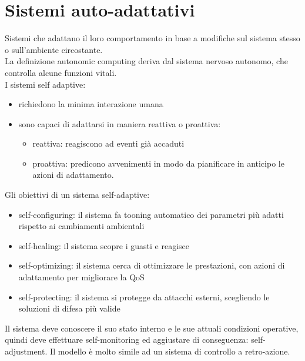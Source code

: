 \documentclass{article}
\begin{document}
\section{Sistemi auto-adattativi}
Sistemi che adattano il loro comportamento in base a modifiche sul sistema stesso o sull'ambiente circostante.\\ La definizione autonomic computing deriva dal sistema nervoso autonomo, che controlla alcune funzioni vitali.\\ I sistemi self adaptive:
\begin{itemize}
\item richiedono la minima interazione umana
\item sono capaci di adattarsi in maniera reattiva o proattiva:
\begin{itemize}
\item reattiva: reagiscono ad eventi già accaduti
\item proattiva: predicono avvenimenti in modo da pianificare in anticipo le azioni di adattamento.
\end{itemize}
\end{itemize}
Gli obiettivi di un sistema self-adaptive:
\begin{itemize}
\item self-configuring: il sistema fa tooning automatico dei parametri più adatti rispetto ai cambiamenti ambientali
\item self-healing: il sistema scopre i guasti e reagisce
\item self-optimizing: il sistema cerca di ottimizzare le prestazioni, con azioni di adattamento per migliorare la QoS
\item self-protecting: il sistema si protegge da attacchi esterni, scegliendo le soluzioni di difesa più valide 
\end{itemize}
Il sistema deve conoscere il suo stato interno e le sue attuali condizioni operative, quindi deve effettuare self-monitoring ed aggiustare di conseguenza: self-adjustment. Il modello è molto simile ad un sistema di controllo a retro-azione.
\end{document}
